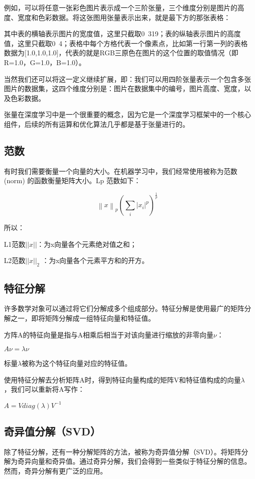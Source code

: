 \documentclass[11pt]{book}
\newcounter{#2}
\newcounter{#2}[#1]
\numberwithin{#2}{#1}
\begin{document}
例如，可以将任意一张彩色图片表示成一个三阶张量，三个维度分别是图片的高度、宽度和色彩数据。将这张图用张量表示出来，就是最下方的那张表格： 


其中表的横轴表示图片的宽度值，这里只截取0~319；表的纵轴表示图片的高度值，这里只截取0~4；表格中每个方格代表一个像素点，比如第一行第一列的表格数据为[1.0,1.0,1.0]，代表的就是RGB三原色在图片的这个位置的取值情况（即R=1.0，G=1.0，B=1.0）。

当然我们还可以将这一定义继续扩展，即：我们可以用四阶张量表示一个包含多张图片的数据集，这四个维度分别是：图片在数据集中的编号，图片高度、宽度，以及色彩数据。

张量在深度学习中是一个很重要的概念，因为它是一个深度学习框架中的一个核心组件，后续的所有运算和优化算法几乎都是基于张量进行的。

\subsection{范数}
有时我们需要衡量一个向量的大小。在机器学习中，我们经常使用被称为范数(norm) 的函数衡量矩阵大小。Lp 范数如下：
\begin{center}
	\begin{equation}
\left \| x \right \|_{p}\left ( \sum_{i}\left | x_{i} \right |^{p}  \right )^{\frac{1}{p}}
\end{equation}
\end{center}

所以：

L1范数$ \left| \left| x \right| \right| $：为x向量各个元素绝对值之和；

L2范数$ \left| \left| x \right|  \right| _{2} $ ：为x向量各个元素平方和的开方。

\subsection{特征分解}
许多数学对象可以通过将它们分解成多个组成部分。特征分解是使用最广的矩阵分解之一，即将矩阵分解成一组特征向量和特征值。

方阵A的特征向量是指与A相乘后相当于对该向量进行缩放的非零向量$ \nu $：

$ A\nu =\lambda \nu $

标量$ \lambda $被称为这个特征向量对应的特征值。 

使用特征分解去分析矩阵A时，得到特征向量构成的矩阵V和特征值构成的向量$ \lambda $，我们可以重新将A写作：

$ A=Vdiag\left( \lambda  \right) V^{-1} $

\subsection{奇异值分解（SVD）}
除了特征分解，还有一种分解矩阵的方法，被称为奇异值分解（SVD）。将矩阵分解为奇异向量和奇异值。通过奇异分解，我们会得到一些类似于特征分解的信息。然而，奇异分解有更广泛的应用。
\end{document}
